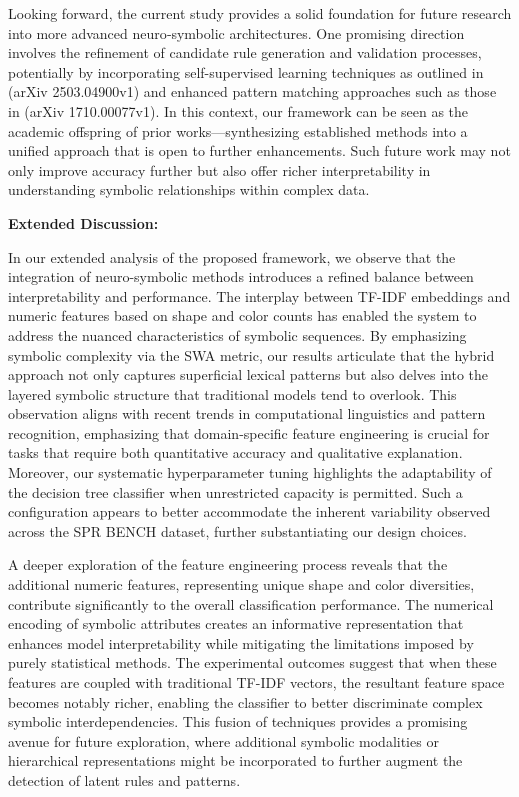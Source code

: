 \documentclass{article}
\begin{document}
Looking forward, the current study provides a solid foundation for future research into more advanced neuro‐symbolic architectures. One promising direction involves the refinement of candidate rule generation and validation processes, potentially by incorporating self-supervised learning techniques as outlined in (arXiv 2503.04900v1) and enhanced pattern matching approaches such as those in (arXiv 1710.00077v1). In this context, our framework can be seen as the academic offspring of prior works—synthesizing established methods into a unified approach that is open to further enhancements. Such future work may not only improve accuracy further but also offer richer interpretability in understanding symbolic relationships within complex data.

\bigskip

\textbf{Extended Discussion:} 

In our extended analysis of the proposed framework, we observe that the integration of neuro-symbolic methods introduces a refined balance between interpretability and performance. The interplay between TF-IDF embeddings and numeric features based on shape and color counts has enabled the system to address the nuanced characteristics of symbolic sequences. By emphasizing symbolic complexity via the SWA metric, our results articulate that the hybrid approach not only captures superficial lexical patterns but also delves into the layered symbolic structure that traditional models tend to overlook. This observation aligns with recent trends in computational linguistics and pattern recognition, emphasizing that domain-specific feature engineering is crucial for tasks that require both quantitative accuracy and qualitative explanation. Moreover, our systematic hyperparameter tuning highlights the adaptability of the decision tree classifier when unrestricted capacity is permitted. Such a configuration appears to better accommodate the inherent variability observed across the SPR BENCH dataset, further substantiating our design choices.

A deeper exploration of the feature engineering process reveals that the additional numeric features, representing unique shape and color diversities, contribute significantly to the overall classification performance. The numerical encoding of symbolic attributes creates an informative representation that enhances model interpretability while mitigating the limitations imposed by purely statistical methods. The experimental outcomes suggest that when these features are coupled with traditional TF-IDF vectors, the resultant feature space becomes notably richer, enabling the classifier to better discriminate complex symbolic interdependencies. This fusion of techniques provides a promising avenue for future exploration, where additional symbolic modalities or hierarchical representations might be incorporated to further augment the detection of latent rules and patterns.
\end{document}
